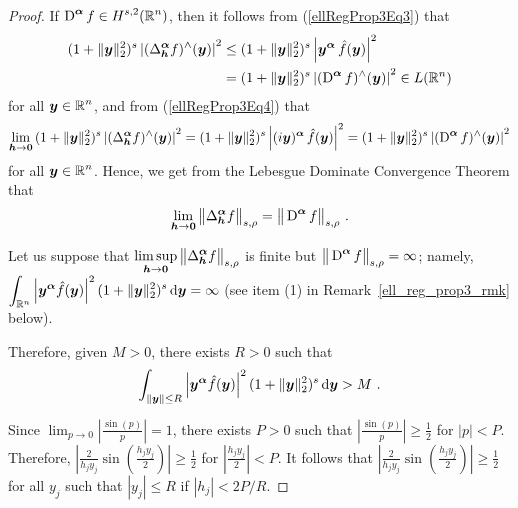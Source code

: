 \begin{proof}
 If $\displaystyle \operatorname{D}^{{\bm{\alpha}}} f \in H^{s,2}(\mathbb{R}^n)$, then
it follows from (\ref{ellRegProp3Eq3}) that
\begin{equation} \label{ellRegProp3Eq5}
\begin{split}
(1+\|{\bm{y}}\|_2^2)^s
\left| (\Delta^{{\bm{\alpha}}}_{{\bm{h}}} f)^\wedge ({\bm{y}}) \right|^2
&\leq (1+\|{\bm{y}}\|_2^2)^s
\left| {\bm{y}}^{{\bm{\alpha}}} \,\hat{f}({\bm{y}})\right|^2 \\
&= (1+\|{\bm{y}}\|_2^2)^s \left| (\operatorname{D}^{{\bm{\alpha}}} f)^\wedge({\bm{y}})\right|^2
\in L(\mathbb{R}^n)
\end{split}
\end{equation}
for all $\displaystyle {\bm{y}} \in \mathbb{R}^n$, and from (\ref{ellRegProp3Eq4}) that
\[
\lim_{{\bm{h}}\to {\bm{0}}} \, (1+\|{\bm{y}}\|_2^2)^s
\left|(\Delta^{{\bm{\alpha}}}_{{\bm{h}}} f)^\wedge({\bm{y}})\right|^2
= (1+\|{\bm{y}}\|_2^2)^s \left|(i {\bm{y}})^{{\bm{\alpha}}}
\,\hat{f}({\bm{y}})\right|^2
= (1+\|{\bm{y}}\|_2^2)^s \left| (\operatorname{D}^{{\bm{\alpha}}} f)^\wedge({\bm{y}})\right|^2
\]
for all $\displaystyle {\bm{y}} \in \mathbb{R}^n$.  Hence, we get from the Lebesgue
Dominate Convergence Theorem that
\[
\lim_{{\bm{h}}\rightarrow {\bm{0}}}
\big\|\Delta^{{\bm{\alpha}}}_{{\bm{h}}} f\big\|_{s,\rho}
= \big\|\operatorname{D}^{{\bm{\alpha}}} f\big\|_{s,\rho} \ .
\]

 Let us suppose that
$\displaystyle \limsup_{{\bm{h}}\rightarrow {\bm{0}}}
\big\|\Delta^{{\bm{\alpha}}}_{{\bm{h}}} f\big\|_{s,\rho}$ is finite but
$\big\|\operatorname{D}^{{\bm{\alpha}}} f\big\|_{s,\rho} = \infty$; namely,\\
$\displaystyle \int_{\mathbb{R}^n} \left| {\bm{y}}^{{\bm{\alpha}}}
\hat{f}({\bm{y}})\right|^2 (1 + \|{\bm{y}}\|_2^2)^s \,\mathrm{d}{{\bm{y}}} = \infty$
(see item (1) in Remark~\ref{ell_reg_prop3_rmk} below).

Therefore, given $M>0$, there exists $R>0$ such that
\[
\int_{\|{\bm{y}}\|\leq R} \left| {\bm{y}}^{{\bm{\alpha}}}\hat{f}({\bm{y}})\right|^2
(1+\|{\bm{y}}\|_2^2)^s \,\mathrm{d}{{\bm{y}}} > M \ .
\]

Since $\displaystyle \lim_{p \to 0}\left|\frac{\sin(p)}{p}\right| = 1$, 
there exists $P>0$ such that
$\displaystyle \left|\frac{\sin(p)}{p}\right| \geq \frac{1}{2}$
for $|p|<P$.  Therefore,
$\displaystyle \left| \frac{2}{h_jy_j} \sin\left(\frac{h_j y_j}{2}\right)\right|
\geq \frac{1}{2}$ for $\displaystyle \left|\frac{h_jy_j}{2}\right|<P$.
It follows that
$\displaystyle \left| \frac{2}{h_jy_j} \sin\left(\frac{h_j y_j}{2}\right)\right|
\geq \frac{1}{2}$ for all $y_j$ such that $|y_j| \leq R$ if
$\displaystyle |h_j| < 2P/R$.


\end{proof}
